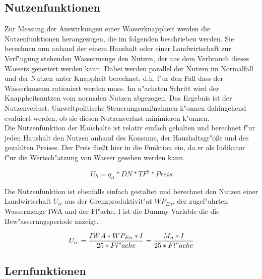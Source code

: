 \documentclass[11pt,a4paper]{article}
\begin{document}
\subsection{Nutzenfunktionen}
\label{Nutzenfunktion}

Zur Messung der Auswirkungen einer Wasserknappheit werden die Nutzenfunktionen herangezogen, die im folgenden beschrieben werden. Sie berechnen nun anhand der einem Haushalt oder einer Landwirtschaft zur Verf"ugung stehenden Wassermenge den Nutzen, der aus dem Verbrauch dieses Wassers generiert werden kann. Dabei werden parallel der Nutzen im Normalfall und der Nutzen unter Knappheit berechnet, d.h. f"ur den Fall dass der Wasserkonsum rationiert werden muss. Im n"achsten Schritt wird der Knappheitsnutzen vom normalen Nutzen abgezogen. Das Ergebnis ist der Nutzenverlust. Umweltpolitische Steuerungsmaßnahmen k"onnen dahingehend eval\-uiert werden, ob sie diesen Nutzenverlust minimieren k"onnen.\\

Die Nutzenfunktion der Haushalte ist relativ einfach gehalten und berechnet f"ur jeden Haushalt den Nutzen anhand des Konsums, der Haushaltsgr"oße und des gezahlten Preises. Der Preis fließt hier in die Funktion ein, da er als Indikator f"ur die Wertsch"atzung von Wasser gesehen werden kann.

\begin{dmath}
U_{h} = q_{it} * DN * TF^{2} * Preis
\label{eq:household-utility-function}
\end{dmath}

Die Nutzenfunktion ist ebenfalls einfach gestaltet und berechnet den Nutzen einer Landwirtschaft $U_{ir}$ aus der Grenzproduktivit"at $WP_{En}$, der zugef"uhrten Wassermenge IWA und der Fl"ache. I ist die Dummy-Variable die die Bew"asserungsperiode anzeigt.

\begin{dmath}
U_{ir} = \frac{IWA * WP_{En} * I}{25 * Fl"ache} = \frac{M_{n} * I}{25 * Fl"ache}
\label{eq:irrigation-utility-function}
\end{dmath}

\subsection{Lernfunktionen}
\end{document}
